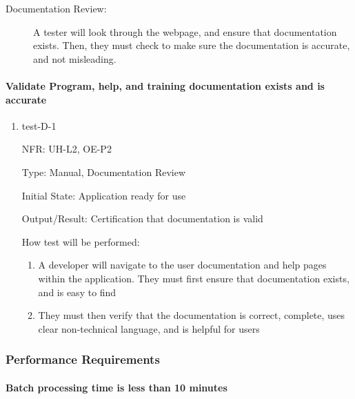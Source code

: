 \documentclass[12pt, titlepage]{article}
\begin{document}
\begin{description}
  \item[Documentation Review:] A tester will look through the webpage, and
  ensure that documentation exists. Then, they must check to make sure the
  documentation is accurate, and not misleading. 
\end{description}

\paragraph{Validate Program, help, and training documentation exists and is accurate}
\begin{enumerate}
  \item{test-D-1}
  
  NFR: UH-L2, OE-P2

  Type: Manual, Documentation Review

  Initial State: Application ready for use

  Output/Result: Certification that documentation is valid

  How test will be performed:
  \begin{enumerate}
    \item A developer will navigate to the user documentation and help pages within the application. They must first ensure that documentation exists, and is easy to find
    \item They must then verify that the documentation is correct, complete, uses clear non-technical language, and is helpful for users
  \end{enumerate}
\end{enumerate}


\subsubsection{Performance Requirements}

\paragraph{Batch processing time is less than 10 minutes}
\end{document}
